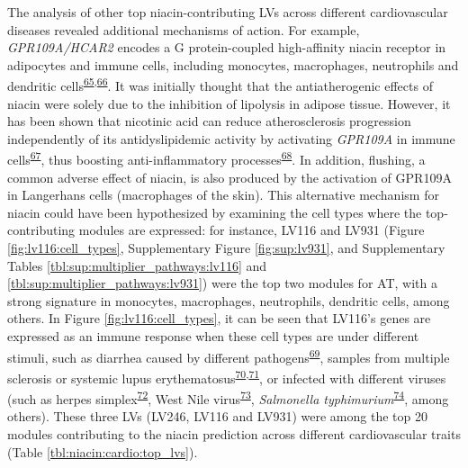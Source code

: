 \documentclass[
  a4paper,
]{article}
\begin{document}
The analysis of other top niacin-contributing LVs across different cardiovascular diseases revealed additional mechanisms of action.
For example, \emph{GPR109A/HCAR2} encodes a G protein-coupled high-affinity niacin receptor in adipocytes and immune cells, including monocytes, macrophages, neutrophils and dendritic cells\textsuperscript{\protect\hyperlink{ref-izbPw2kc}{65},\protect\hyperlink{ref-wI0IjT3i}{66}}.
It was initially thought that the antiatherogenic effects of niacin were solely due to the inhibition of lipolysis in adipose tissue.
However, it has been shown that nicotinic acid can reduce atherosclerosis progression independently of its antidyslipidemic activity by activating \emph{GPR109A} in immune cells\textsuperscript{\protect\hyperlink{ref-1Bz0jRHYo}{67}}, thus boosting anti-inflammatory processes\textsuperscript{\protect\hyperlink{ref-1DblG8swn}{68}}.
In addition, flushing, a common adverse effect of niacin, is also produced by the activation of GPR109A in Langerhans cells (macrophages of the skin).
This alternative mechanism for niacin could have been hypothesized by examining the cell types where the top-contributing modules are expressed:
for instance, LV116 and LV931 (Figure \ref{fig:lv116:cell_types}, Supplementary Figure \ref{fig:sup:lv931}, and Supplementary Tables \ref{tbl:sup:multiplier_pathways:lv116} and \ref{tbl:sup:multiplier_pathways:lv931}) were the top two modules for AT, with a strong signature in monocytes, macrophages, neutrophils, dendritic cells, among others.
In Figure \ref{fig:lv116:cell_types}, it can be seen that LV116's genes are expressed as an immune response when these cell types are under different stimuli, such as diarrhea caused by different pathogens\textsuperscript{\protect\hyperlink{ref-RliFvowC}{69}}, samples from multiple sclerosis or systemic lupus erythematosus\textsuperscript{\protect\hyperlink{ref-D5XBhzim}{70},\protect\hyperlink{ref-EnoqU4ga}{71}}, or infected with different viruses (such as herpes simplex\textsuperscript{\protect\hyperlink{ref-11eausmiy}{72}}, West Nile virus\textsuperscript{\protect\hyperlink{ref-mtMYROCN}{73}}, \emph{Salmonella typhimurium}\textsuperscript{\protect\hyperlink{ref-1kgcHkGm}{74}}, among others).
These three LVs (LV246, LV116 and LV931) were among the top 20 modules contributing to the niacin prediction across different cardiovascular traits (Table \ref{tbl:niacin:cardio:top_lvs}).
\end{document}
